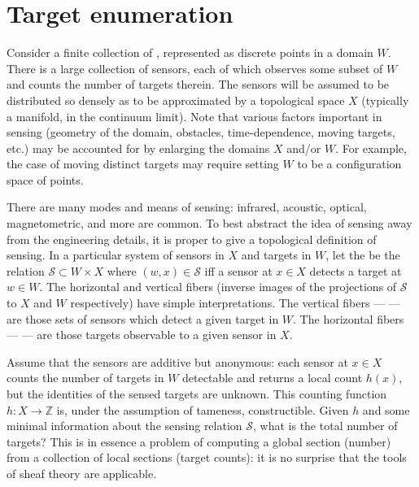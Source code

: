 \documentclass{psapm-l}
\theoremstyle{definition}
\theoremstyle{remark}
\numberwithin{equation}{section}
\begin{document}
\section{Target enumeration}
\label{sec:target}

Consider a finite collection of {{}}, represented as discrete points in a domain $W$. There is a large collection of sensors, each of which observes some subset of $W$ and counts the number of targets therein. The sensors will be assumed to be distributed so densely as to be approximated by a topological space $X$ (typically a manifold, in the continuum limit). Note that various factors important in sensing (geometry of the domain, obstacles, time-dependence, moving targets, etc.) may be accounted for by enlarging the domains $X$ and/or $W$. For example, the case of moving distinct targets may require setting $W$ to be a configuration space of points.

There are many modes and means of sensing: infrared, acoustic, optical, magnetometric, and more are common. To best abstract the idea of sensing away from the engineering details, it is proper to give a topological definition of sensing. In a particular system of sensors in $X$ and targets in $W$, let the {{}} be the relation ${{\mathcal S}}\subset W\times X$ where $(w,x)\in{{\mathcal S}}$ iff a sensor at $x\in X$ detects a target at $w\in W$. The horizontal and vertical fibers (inverse images of the projections of ${{\mathcal S}}$ to $X$ and $W$ respectively) have simple interpretations. The vertical fibers --- {{}} --- are those sets of sensors which detect a given target in $W$. The horizontal fibers --- {{}} --- are those targets observable to a given sensor in $X$.

Assume that the sensors are additive but anonymous: each sensor at $x\in X$ counts the number of targets in $W$ detectable and returns a local count $h(x)$, but the identities of the sensed targets are unknown. This counting function $h\colon X\to{{\mathbb Z}}$ is, under the assumption of tameness, constructible. Given $h$ and some minimal information about the sensing relation ${{\mathcal S}}$, what is the total number of targets? This is in essence a problem of computing a global section (number) from a collection of local sections (target counts): it is no surprise that the tools of sheaf theory are applicable.
\end{document}
